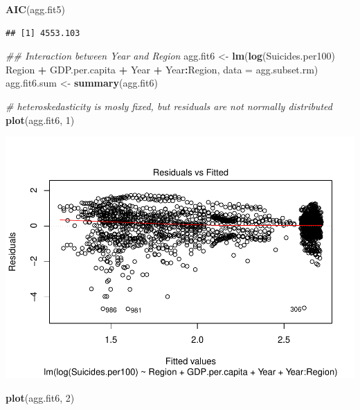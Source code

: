 \documentclass[11pt,]{article}
\newenvironment{Shaded}{\begin{snugshade}}{\end{snugshade}}
\newcommand{\CommentTok}[1]{\textcolor[rgb]{0.56,0.35,0.01}{\textit{#1}}}
\newcommand{\DataTypeTok}[1]{\textcolor[rgb]{0.13,0.29,0.53}{#1}}
\newcommand{\DecValTok}[1]{\textcolor[rgb]{0.00,0.00,0.81}{#1}}
\newcommand{\KeywordTok}[1]{\textcolor[rgb]{0.13,0.29,0.53}{\textbf{#1}}}
\newcommand{\NormalTok}[1]{#1}
\newcommand{\OperatorTok}[1]{\textcolor[rgb]{0.81,0.36,0.00}{\textbf{#1}}}
\newcommand{\StringTok}[1]{\textcolor[rgb]{0.31,0.60,0.02}{#1}}
\begin{document}
\begin{Shaded}
\begin{Highlighting}[]
\KeywordTok{AIC}\NormalTok{(agg.fit5)}
\end{Highlighting}
\end{Shaded}

\begin{verbatim}
## [1] 4553.103
\end{verbatim}

\begin{Shaded}
\begin{Highlighting}[]
\CommentTok{## Interaction between Year and Region}
\NormalTok{agg.fit6 <-}\StringTok{ }\KeywordTok{lm}\NormalTok{(}\KeywordTok{log}\NormalTok{(Suicides.per100) }\OperatorTok{~}\StringTok{ }\NormalTok{Region }\OperatorTok{+}\StringTok{ }\NormalTok{GDP.per.capita }\OperatorTok{+}\StringTok{ }\NormalTok{Year }\OperatorTok{+}\StringTok{ }\NormalTok{Year}\OperatorTok{:}\NormalTok{Region, }\DataTypeTok{data =}\NormalTok{ agg.subset.rm)}
\NormalTok{agg.fit6.sum <-}\StringTok{ }\KeywordTok{summary}\NormalTok{(agg.fit6)}

\CommentTok{# heteroskedasticity is mosly fixed, but residuals are not normally distributed}
\KeywordTok{plot}\NormalTok{(agg.fit6, }\DecValTok{1}\NormalTok{)}
\end{Highlighting}
\end{Shaded}

\includegraphics{An-Analysis-of-Suicide-Data_files/figure-latex/unnamed-chunk-10-1.pdf}

\begin{Shaded}
\begin{Highlighting}[]
\KeywordTok{plot}\NormalTok{(agg.fit6, }\DecValTok{2}\NormalTok{)}
\end{Highlighting}
\end{Shaded}
\end{document}
